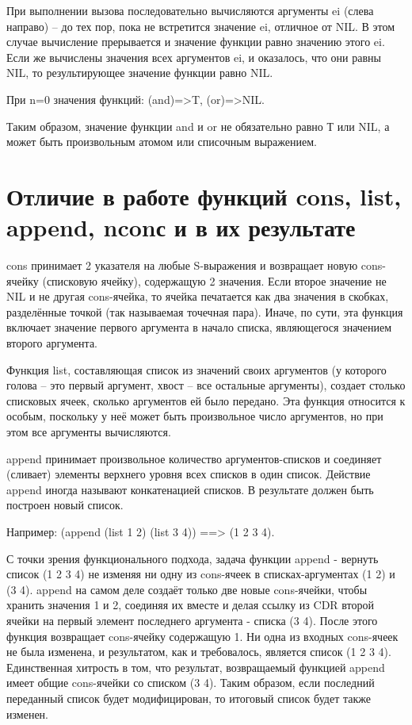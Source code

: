\documentclass{article}
\begin{document}
При выполнении вызова последовательно вычисляются аргументы ei (слева направо) – до тех пор, пока не встретится значение ei, отличное от NIL. В этом случае вычисление прерывается и значение функции равно значению этого ei. Если же вычислены значения всех аргументов ei, и оказалось, что они равны NIL, то результирующее значение функции равно NIL.

При n=0 значения функций: (and)=>T, (or)=>NIL.

Таким образом, значение функции and и or не обязательно равно Т или NIL, а может быть произвольным атомом или списочным выражением.




\section*{Отличие в работе функций cons, list, append, nconс и в их результате}

cons принимает 2 указателя на любые S-выражения и возвращает новую cons-ячейку (списковую ячейку), содержащую 2 значения. Если второе значение не NIL и не другая cons-ячейка, то ячейка печатается как два значения в скобках, разделённые точкой (так называемая точечная пара). Иначе, по сути, эта функция включает значение первого аргумента в начало списка, являющегося значением второго аргумента. 

Функция list, составляющая список из значений своих аргументов (у которого голова -- это первый аргумент, хвост -- все остальные аргументы), создает столько списковых ячеек, сколько аргументов ей было передано. Эта функция относится к особым, поскольку у неё может быть произвольное число аргументов, но при этом все аргументы вычисляются.

append принимает произвольное количество аргументов-списков и соединяет (сливает)  элементы верхнего уровня всех списков в один список. Действие append иногда называют конкатенацией списков. В результате должен быть построен новый список.

Например: (append (list 1 2) (list 3 4)) ==> (1 2 3 4). 

С точки зрения функционального подхода, задача функции append - вернуть список (1 2 3 4) не изменяя ни одну из cons-ячеек в списках-аргументах (1 2) и (3 4). append на самом деле создаёт только две новые cons-ячейки, чтобы хранить значения 1 и 2, соединяя их вместе и делая ссылку из CDR второй ячейки на первый элемент последнего аргумента - списка (3 4). После этого функция возвращает cons-ячейку содержащую 1. Ни одна из входных cons-ячеек не была изменена, и результатом, как и требовалось, является список (1 2 3 4). Единственная хитрость в том, что результат, возвращаемый функцией append имеет общие cons-ячейки со списком (3 4). Таким образом, если последний переданный список будет модифицирован, то  итоговый список будет также изменен.
\end{document}
